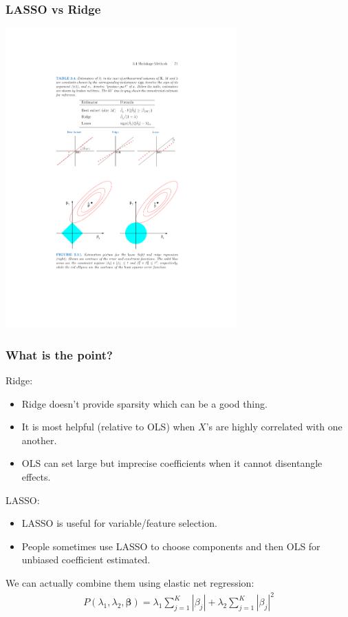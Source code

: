 \begin{frame}
\frametitle{LASSO vs Ridge}
\begin{center}
\includegraphics[width=3.5in]{./resources/geometry}
\end{center}
\end{frame}

\begin{frame}
\frametitle{What is the point?}
\vspace{-10pt}
Ridge:
\begin{itemize}
\item Ridge doesn't provide sparsity which can be a good thing.
\item It is most helpful (relative to OLS) when $X$'s are highly correlated with one another.
\item OLS can set large but imprecise coefficients when it cannot disentangle effects.
\end{itemize}
LASSO:
\begin{itemize}
\item LASSO is useful for variable/feature selection.
\item People sometimes use LASSO to choose components and then OLS for unbiased coefficient estimated.
\end{itemize}
We can actually combine them using \alert{elastic net regression}:
\begin{eqnarray*}
 P(\lambda_1,\lambda_2,\mathbf{\beta}) =  \lambda _1\sum_{j=1}^K | \beta_j|  +\lambda_2 \sum_{j=1}^K | \beta_j|^2 
 \end{eqnarray*}
\end{frame}


